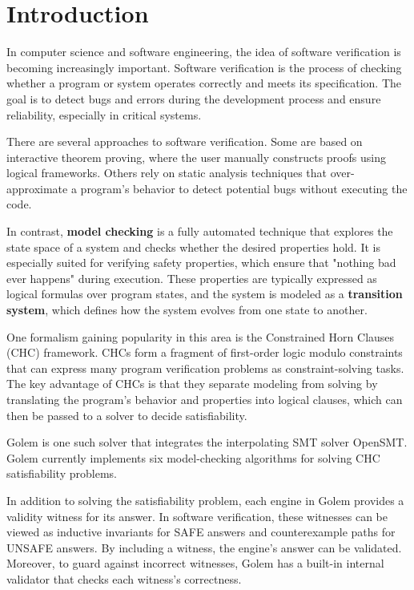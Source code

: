 \chapter{Introduction}

\noindent In computer science and software engineering, the idea of software
verification is becoming increasingly important. Software verification is the
process of checking whether a program or system operates correctly and meets
its specification. The goal is to detect bugs and errors during the development
process and ensure reliability, especially in critical systems.

There are several approaches to software verification. Some are based on
interactive theorem proving, where the user manually constructs proofs using
logical frameworks. Others rely on static analysis techniques that
over-approximate a program's behavior to detect potential bugs without
executing the code. 

In contrast, \textbf{model checking} is a fully automated technique that explores the
state space of a system and checks whether the desired properties hold. It is
especially suited for verifying safety properties, which ensure that "nothing
bad ever happens" during execution. These properties are typically expressed as
logical formulas over program states, and the system is modeled as a
\textbf{transition system}, which defines how the system evolves from one state
to another.

One formalism gaining popularity in this area is the Constrained Horn Clauses
(CHC)\cite{10.1007/978-3-031-13185-1_2} framework. CHCs form a fragment of
first-order logic modulo constraints that can express many program verification
problems as constraint-solving tasks. The key advantage of CHCs is that they
separate modeling from solving by translating the program’s behavior and
properties into logical clauses, which can then be passed to a solver to decide
satisfiability.

Golem\cite{blicha_golem_2023} is one such solver that integrates the
interpolating SMT solver OpenSMT\cite{10.1007/978-3-319-40970-2_35}. Golem
currently implements six model-checking algorithms for solving CHC
satisfiability problems.

In addition to solving the satisfiability problem, each engine in Golem
provides a validity witness for its answer. In software verification, these
witnesses can be viewed as inductive invariants for SAFE answers and
counterexample paths for UNSAFE answers. By including a witness, the engine's
answer can be validated. Moreover, to guard against incorrect witnesses, Golem
has a built-in internal validator that checks each witness's correctness.

